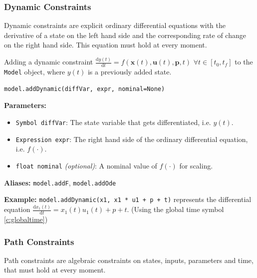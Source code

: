 \documentclass[12pt]{article}
\newcommand{\dd}{\mathrm{d}}
\renewcommand{\v}{\bm}
\begin{document}
\subsubsection{Dynamic Constraints}

Dynamic constraints are explicit ordinary differential equations with
the derivative of a state on the left hand side and the corresponding rate of
change on the right hand side. This equation must hold at every moment.

\begin{mdframed}[backgroundcolor=gray!10, roundcorner=10pt,
		linewidth=1pt]

	Adding a dynamic constraint $\frac{\dd y(t)}{\dd t} =
		f(\v{x}(t), \v{u}(t), \v{p}, t) \,\, \forall t \in [t_0, t_f]$
	to
	the \texttt{Model}
	object, where $y(t)$ is a previously added state.

	\begin{lstlisting}
model.addDynamic(diffVar, expr, nominal=None)
		\end{lstlisting}
	\label{addDynamic}
	\textbf{Parameters:}
	\begin{itemize}
		\item \texttt{Symbol diffVar}: The state variable that
		      gets differentiated, i.e. $y(t)$.
		\item \texttt{Expression expr}: The right hand side of
		      the ordinary differential equation, i.e. $f(\cdot)$.
		\item \texttt{float nominal} \emph{(optional)}: A
		      nominal value of $f(\cdot)$ for scaling.
	\end{itemize}

	\textbf{Aliases:}  \texttt{model.addF}, \texttt{model.addOde}

	\textbf{Example:} \texttt{model.addDynamic(x1, x1 * u1 + p +
		t)} represents the differential equation
	$\frac{\dd x_1(t)}{\dd t} = x_1(t) u_1(t) + p + t$. (Using the
	global time symbol \eqref{c:globaltime})
\end{mdframed}

\subsubsection{Path Constraints}

Path constraints are algebraic constraints on states, inputs,
parameters and time, that must hold at every moment.
\end{document}
